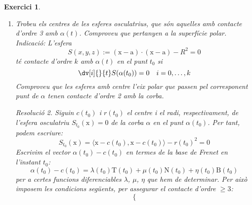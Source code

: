 \documentclass[10pt,a4paper]{article}
\newcommand{\vf}[1]{\boldsymbol{\mathrm{#1}}} %
\newtheorem{exercice}{Exercici}
\theoremstyle{remark}
\newtheorem*{resolution}{Resolució}
\theoremstyle{math}
\begin{document}
\begin{exercice}
\begin{enumerate}
\begin{resolution}
$$\begin{aligned}
              \end{aligned}
              \right.
            $$
            on hem utilitzat que $\vf{T}'=k\vf{N}$, essent $k$ la curvatura de $\alpha$. De la primera equació deduïm que $a(t,s)=0$ i de la segona:
            \begin{align*}
              \pdv{\Pi_t}{t}(\vf{x})\bigg|_{\vf{x}=\varphi(t,s)}=0 & \iff -1+k(t)\langle\varphi(t,s)-\alpha(t),\vf{N}\rangle=0  \\
                                                                   & \iff k(t)\langle b(t,s)\vf{N}+c(t,s)\vf{B},\vf{N}\rangle=1 \\
                                                                   & \iff k(t)b(t,s)=1
            \end{align*}
            Per tant, necessitem $b(t,s)=1/k(t)=\rho(t)$. Observem que per a qualsevol funció $c(t,s)$, $\varphi(t,s)$ compleix les condicions requerides. Per tant, aquesta ha de ser $c(t,s)=s$, fent aparèixer un nou parametre lliure. Així doncs, obtenim finalment el que volíem:
            $$\varphi(t, s) = \alpha(t) + \rho(t)\vf{N}(t) + s\vf{B}(t)$$
          \end{resolution}
    \item Trobeu els centres de les esferes osculatrius, que són aquelles amb contacte d'ordre 3 amb $\alpha(t)$. Comproveu que pertanyen a la superfície polar.\\
          \emph{Indicació}: L'esfera $$S(x,y,z):=(\vf{x}-\vf{a})\cdot(\vf{x}-\vf{a})-R^2=0$$ té contacte d'ordre $k$ amb $\alpha(t)$ en el punt $t_0$ si $$\dv[i]{}{t}S(\alpha(t_0))=0\quad i=0,\ldots,k$$ Comproveu que les esferes amb centre l'eix polar que passen pel corresponent punt de $\alpha$ tenen contacte d'ordre 2 amb la corba.
          \begin{resolution}
            Siguin $c(t_0)$ i $r(t_0)$ el centre i el radi, respectivament, de l'esfera osculatriu $S_{t_0}(\vf{x})=0$ de la corba $\alpha$ en el punt $\alpha(t_0)$. Per tant, podem escriure: $$S_{t_0}(\vf{x})=\langle\vf{x}-c(t_0),\vf{x}-c(t_0)\rangle-{r(t_0)}^2=0$$ Escrivim el vector $\alpha(t_0)-c(t_0)$ en termes de la base de Frenet en l'instant $t_0$: $$\alpha(t_0)-c(t_0)=\lambda(t_0)\vf{T}(t_0)+\mu(t_0)\vf{N}(t_0)+\eta(t_0)\vf{B}(t_0)$$
            per a certes funcions diferenciables $\lambda$, $\mu$, $\eta$ que hem de determinar. Per això imposem les condicions següents, per assegurar el contacte d'ordre $\geq 3$:
            \begin{equation}\label{sphere}
              \left\{

\end{equation}
\end{resolution}
\end{enumerate}
\end{exercice}
\end{document}
